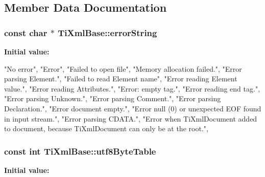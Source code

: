 \subsection{\-Member \-Data \-Documentation}
\hypertarget{classTiXmlBase_a7ac8feec4100e446b3d78e1ac0659700}{
\subsubsection[{error\-String}]{\setlength{\rightskip}{0pt plus 5cm}const char $\ast$ \-Ti\-Xml\-Base\-::error\-String}}
\label{d8/d47/classTiXmlBase_a7ac8feec4100e446b3d78e1ac0659700}
{\bfseries \-Initial value\-:}
\begin{DoxyCode}

{
        "No error",
        "Error",
        "Failed to open file",
        "Memory allocation failed.",
        "Error parsing Element.",
        "Failed to read Element name",
        "Error reading Element value.",
        "Error reading Attributes.",
        "Error: empty tag.",
        "Error reading end tag.",
        "Error parsing Unknown.",
        "Error parsing Comment.",
        "Error parsing Declaration.",
        "Error document empty.",
        "Error null (0) or unexpected EOF found in input stream.",
        "Error parsing CDATA.",
        "Error when TiXmlDocument added to document, because TiXmlDocument can
       only be at the root.",
}
\end{DoxyCode}
\hypertarget{classTiXmlBase_ac8c86058137bdb4b413c3eca58f2d467}{
\subsubsection[{utf8\-Byte\-Table}]{\setlength{\rightskip}{0pt plus 5cm}const int \-Ti\-Xml\-Base\-::utf8\-Byte\-Table}}
\label{d8/d47/classTiXmlBase_ac8c86058137bdb4b413c3eca58f2d467}
{\bfseries \-Initial value\-:}
